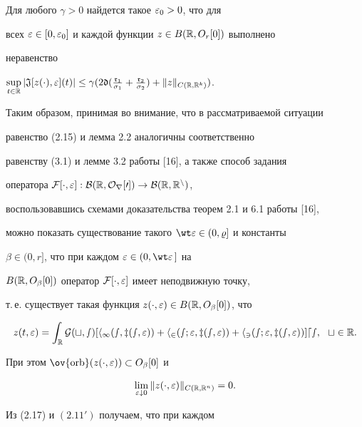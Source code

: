 \begin{lems}


Для любого $\gamma>0$ найдется такое $\varepsilon_0>0$, что для


всех $\varepsilon\in[0,\varepsilon_0]$ и каждой функции $z\in B(\Bbb R,O_r[0])$ выполнено


неравенство


$\sup\lt_{t\in\R} |\frak J[z(\cdot),\ve](t)|\le


\gamma(2\gd(\frac{\gr_1}{\sigma_1}+


\frac{\gr_2}{\sigma_2})+\|z\|_{C(\R,\R^k)})$.


\end{lems}





Таким образом, принимая во внимание, что в рассматриваемой ситуации


равенство (2.15) и лемма 2.2 аналогичны соответственно


равенству (3.1) и лемме 3.2 работы [16], а также способ задания


оператора $\cal F[\cdot,\varepsilon]: B(\Bbb R,O_r[0])\to B(\Bbb R,\Bbb R^n)$,


воспользовавшись схемами доказательства теорем 2.1 и 6.1 работы [16],


можно показать существование такого $\wt\ve\in(0,\vr]$ и константы\linebreak


$\beta\in(0,r]$, что при каждом $\ve\in(0,\wt\ve\,]$ на


$B(\Bbb R,O_{\beta}[0])$ оператор $\cal F[\cdot,\varepsilon]$ имеет неподвижную точку,


т.\,е. существует такая функция $z(\cdot,\varepsilon)\in B(\Bbb R,O_{\beta}[0])$, что


\begin{equation}


z(t,\ve)=\int_{\R} \pG(t,s)[h_1(s,z(s,\ve))+h_2(s;\ve,z(s,\ve))+


h_3(s;\ve,z(s,\ve))]ds,\ \ t\in\R.


\end{equation}


При этом $\ov{\orb}(z(\cdot,\ve))\subset O_{\beta}[0]$ и


\begin{equation}


\lim_{\ve\downarrow 0} \|z(\cdot,\ve)\|_{C(\R,\R^n)}=0.


\end{equation}


Из (2.17) и $(2.11')$ получаем, что при каждом


